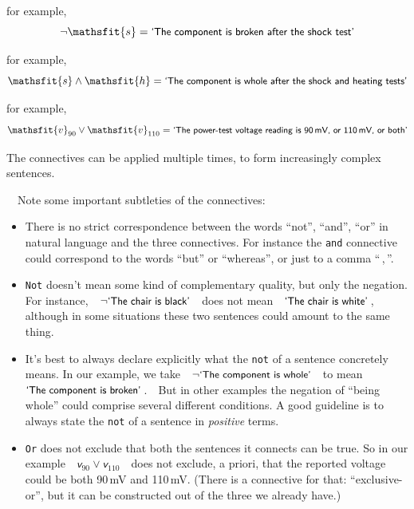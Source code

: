 \documentclass[
  a4paper,
  DIV=11,
  numbers=noendperiod,
  oneside]{scrreprt}
\providecommand{\tightlist}{%
  \setlength{\itemsep}{0pt}\setlength{\parskip}{0pt}}\usepackage{longtable,booktabs,array}
\begin{document}
\begin{description}
\tightlist
\item[{Not:~~\(\lnot\)}]
for example, \[
\lnot \mathsfit{s} = \textsf{\small`The component is broken after the shock test'}
\]
\item[{And:~~\(\land\)}]
for example, \[
\mathsfit{s} \land \mathsfit{h} = \textsf{\small`The component is whole after the shock and heating tests'}
\]
\item[{Or:~~\(\lor\)}]
for example, \[
\mathsfit{v}_{90} \lor \mathsfit{v}_{110} = \textsf{\small`The power-test voltage reading is 90\,mV, or 110\,mV, or both'}
\]
\end{description}

\hfill\break

The connectives can be applied multiple times, to form increasingly
complex sentences.

~~Note some important subtleties of the
connectives:

\begin{itemize}
\item
  There is no strict correspondence between the words ``not'', ``and'',
  ``or'' in natural language and the three connectives. For instance the
  \texttt{and} connective could correspond to the words ``but'' or
  ``whereas'', or just to a comma ``\,,\,''.
\item
  \texttt{Not} doesn't mean some kind of complementary quality, but only
  the negation. For
  instance,~~\(\lnot\textsf{\small`The chair is black'}\)~~does not
  mean~~{\(\textsf{\small`The chair is white'}\)\,,}~~ although in some
  situations these two sentences could amount to the same thing.
\item
  It's best to always declare explicitly what the \texttt{not} of a
  sentence concretely means. In our example, we
  take~~\(\lnot\textsf{\small`The component is whole'}\)~~to
  mean~~{\(\textsf{\small`The component is broken'}\)\,.}~~But in other
  examples the negation of ``being whole'' could comprise several
  different conditions. A good guideline is to always state the
  \texttt{not} of a sentence in \emph{positive} terms.
\item
  \texttt{Or} does not exclude that both the sentences it connects can
  be true. So in our
  example~~\(\mathsfit{v}_{90} \lor \mathsfit{v}_{110}\)~~does not
  exclude, a priori, that the reported voltage could be both 90\,mV and
  110\,mV. (There is a connective for that: ``exclusive-or'', but it can
  be constructed out of the three we already have.)
\end{itemize}
\end{document}
